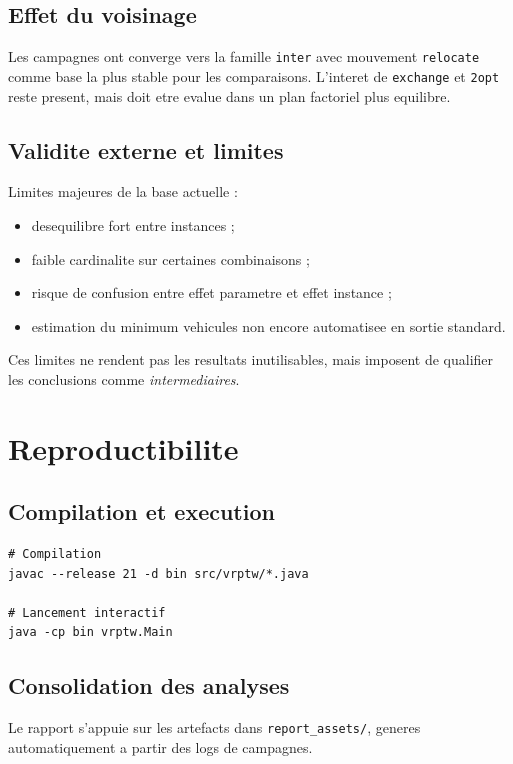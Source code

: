 \documentclass[12pt,a4paper]{report}
\begin{document}
\section{Effet du voisinage}
Les campagnes ont converge vers la famille \texttt{inter} avec mouvement \texttt{relocate}
comme base la plus stable pour les comparaisons.
L'interet de \texttt{exchange} et \texttt{2opt} reste present,
mais doit etre evalue dans un plan factoriel plus equilibre.

\section{Validite externe et limites}
Limites majeures de la base actuelle :
\begin{itemize}[leftmargin=1.2cm]
  \item desequilibre fort entre instances ;
  \item faible cardinalite sur certaines combinaisons ;
  \item risque de confusion entre effet parametre et effet instance ;
  \item estimation du minimum vehicules non encore automatisee en sortie standard.
\end{itemize}

Ces limites ne rendent pas les resultats inutilisables,
mais imposent de qualifier les conclusions comme \textit{intermediaires}.

\chapter{Reproductibilite}

\section{Compilation et execution}
\begin{lstlisting}[style=javastyle,language={}]
# Compilation
javac --release 21 -d bin src/vrptw/*.java

# Lancement interactif
java -cp bin vrptw.Main
\end{lstlisting}

\section{Consolidation des analyses}
Le rapport s'appuie sur les artefacts dans \texttt{report\_assets/},
generes automatiquement a partir des logs de campagnes.
\end{document}
